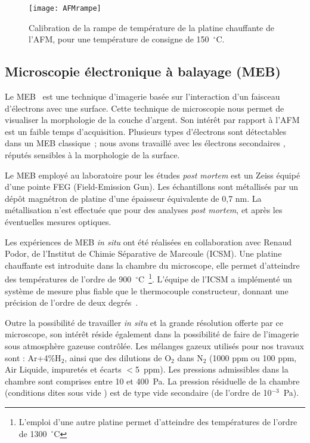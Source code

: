 \begin{figure}[!htb]
\centering
\texttt{[image: AFMrampe]}
\caption{Calibration de la rampe de température de la platine chauffante de l'AFM, pour une température de consigne de 150~$^\circ$C.}
\label{AFMrampe}
\end{figure}

	\subsection{Microscopie électronique à balayage (MEB)}
Le MEB~\cite{oatley1966scanning} est une technique d'imagerie basée sur l'interaction d'un faisceau d'électrons avec une surface. Cette technique de microscopie nous permet de visualiser la morphologie de la couche d'argent. Son intérêt par rapport à l'AFM est un faible temps d'acquisition. Plusieurs types d'électrons sont détectables dans un MEB classique~; nous avons travaillé avec les électrons \og secondaires \fg, réputés sensibles à la morphologie de la surface.\par 
Le MEB employé au laboratoire pour les études \textit{post mortem} est un Zeiss équipé d'une pointe FEG (Field-Emission Gun). Les échantillons sont métallisés par un dépôt magnétron de platine d'une épaisseur équivalente de 0,7 nm. La métallisation n'est effectuée que pour des analyses \textit{post mortem}, et après les éventuelles mesures optiques.\par 
Les expériences de MEB \textit{in situ} ont été réalisées en collaboration avec Renaud Podor, de l'Institut de Chimie Séparative de Marcoule (ICSM). Une platine chauffante est introduite dans la chambre du microscope, elle permet d'atteindre des températures de l'ordre de 900~$^\circ$C~\footnote{L'emploi d'une autre platine permet d'atteindre des températures de l'ordre de 1300~$^\circ$C}. L'équipe de l'ICSM a implémenté un système de mesure plus fiable que le thermocouple constructeur, donnant une précision de l'ordre de deux degrés~\cite{podor2015development}.\par 
Outre la possibilité de travailler \textit{in situ} et la grande résolution offerte par ce microscope, son intérêt réside également dans la possibilité de faire de l'imagerie sous atmosphère gazeuse contrôlée. Les mélanges gazeux utilisés pour nos travaux sont : Ar+4\%H$_2$, ainsi que des dilutions de O$_2$ dans N$_2$ (1000 ppm ou 100 ppm, Air Liquide, impuretés et écarts $<$5~ppm). Les pressions admissibles dans la chambre sont comprises entre 10 et 400~Pa. La pression résiduelle de la chambre (conditions dites \og sous vide \fg) est de type vide secondaire (de l'ordre de 10$^{-3}$~Pa).\par 
